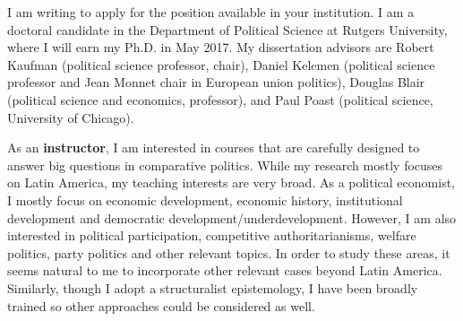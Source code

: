 \documentclass[10pt,stdletter,dateno,sigleft]{newlfm} %
\begin{document}
\begin{newlfm}


\vspace{-0.3cm}I am writing to apply for the position available in your institution. I am a doctoral candidate in the Department of Political Science at Rutgers University, where I will earn my Ph.D. in May 2017. My dissertation advisors are Robert Kaufman (political science professor, chair), Daniel Kelemen (political science professor and Jean Monnet chair in European union politics), Douglas Blair (political science and economics, professor), and Paul Poast (political science, University of Chicago).



As an {\bf instructor}, I am interested in courses that are carefully designed to answer big questions in comparative politics. While my research mostly focuses on Latin America, my teaching interests are very broad. As a political economist, I mostly focus on economic development, economic history, institutional development and democratic development/underdevelopment. However, I am also interested in political participation, competitive authoritarianisms, welfare politics, party politics and other relevant topics. In order to study these areas, it seems natural to me to incorporate other relevant cases beyond Latin America. Similarly, though I adopt a structuralist epistemology, I have been broadly trained so other approaches could be considered as well. 


\end{newlfm}
\end{document}
